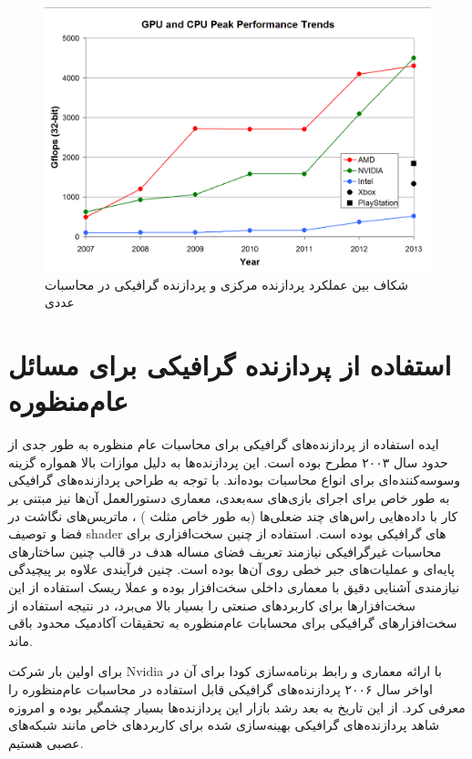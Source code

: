 \documentclass{thesis}
\begin{document}
\begin{figure}[h]
\centering
\includegraphics[width=\textwidth]{./pics/6}
\caption{شکاف بین عملکرد پردازنده مرکزی و پردازنده گرافیکی در محاسبات عددی}
\label{cpugpuperformancegap}
\end{figure}

\section{
استفاده از پردازنده گرافیکی برای مسائل عام‌منظوره
}

ایده استفاده از پردازنده‌های گرافیکی برای محاسبات عام منظوره به طور جدی از حدود سال ۲۰۰۳ مطرح بوده است. این پردازنده‌ها به دلیل موازات بالا همواره گزینه وسوسه‌کننده‌ای برای انواع محاسبات بوده‌اند. با توجه به طراحی پردازنده‌های گرافیکی به طور خاص برای اجرای بازی‌های سه‌بعدی، معماری دستور‌العمل
 آن‌ها نیز مبتنی بر کار با داده‌هایی راس‌های چند ضعلی‌ها (به طور خاص مثلث
)
، ماتریس‌های نگاشت در فضا و توصیف‌ 
shader
های گرافیکی بوده است. استفاده از چنین سخت‌افزاری برای محاسبات غیرگرافیکی نیازمند تعریف فضای مساله‌ هدف در قالب چنین ساختار‌های پایه‌ای و عملیات‌های جبر خطی روی آن‌ها بوده است. چنین فرآیندی علاوه بر پیچیدگی نیازمندی آشنایی دقیق با معماری داخلی سخت‌افزار بوده و عملا ریسک استفاده از این سخت‌افزار‌ها برای کاربرد‌های صنعتی را بسیار بالا می‌برد، در نتیجه استفاده از سخت‌افزار‌های گرافیکی برای محسابات عام‌منظوره به تحقیقات آکادمیک محدود باقی ماند.

برای اولین بار شرکت
Nvidia
با ارائه معماری
و رابط برنامه‌سازی
کودا
برای آن در اواخر سال ۲۰۰۶ پردازنده‌های گرافیکی قابل استفاده در محاسبات عام‌منظوره را معرفی کرد. از این تاریخ به بعد رشد بازار این پردازنده‌ها بسیار چشمگیر بوده و امروزه شاهد پردازنده‌های گرافیکی بهینه‌سازی شده برای کاربرد‌های خاص مانند شبکه‌های عصبی هستیم.
\end{document}
